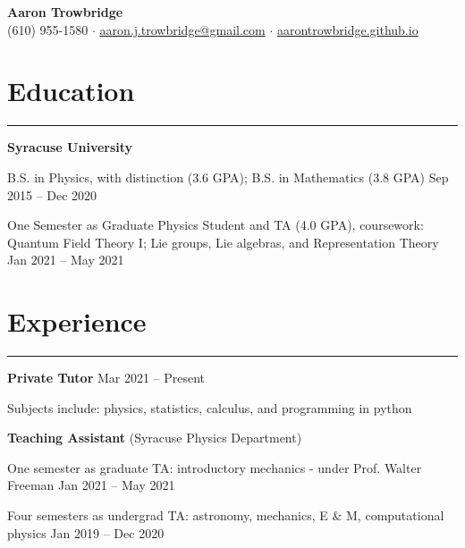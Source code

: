 \documentclass[9pt]{extarticle}
\newcommand{\myline}{\rule[\baselineskip]{\linewidth}{1pt}}
\begin{document}
\begin{center}
\Huge
\textbf{Aaron Trowbridge}\\

\normalsize
(610) 955-1580 $\cdot$ \href{mailto:aaron.j.trowbridge@gmail.com}{aaron.j.trowbridge@gmail.com} $\cdot$ \href{https://aarontrowbridge.github.io/}{aarontrowbridge.github.io} \\

\end{center}


\section{Education}

\myline


\large\textbf{Syracuse University} 

\normalsize
\begin{compactitem}
\setlength\itemsep{0em}
\item B.S. in Physics, with distinction (3.6 GPA); B.S. in Mathematics (3.8 GPA) \hfill \small Sep 2015 -- Dec 2020 
\item One Semester as Graduate Physics Student and TA (4.0 GPA), coursework: \\ Quantum Field Theory I; Lie groups, Lie algebras, and Representation Theory \hfill \small Jan 2021 -- May 2021
\end{compactitem}


\section{Experience}

\myline

\large\textbf{Private Tutor} \hfill \small Mar 2021 -- Present
\normalsize

\begin{compactitem}
\item Subjects include: physics, statistics, calculus, and programming in python
\end{compactitem}

\vspace{2.5pt}
\large\textbf{Teaching Assistant} \normalsize (Syracuse Physics Department)
\normalsize

\begin{compactitem}
\item One semester as graduate TA: introductory mechanics - under Prof. Walter Freeman \hfill \small Jan 2021 -- May 2021
\item Four semesters as undergrad TA: astronomy, mechanics, E $\&$ M, computational physics  \hfill \small Jan 2019 -- Dec 2020
\end{compactitem}
\end{document}

